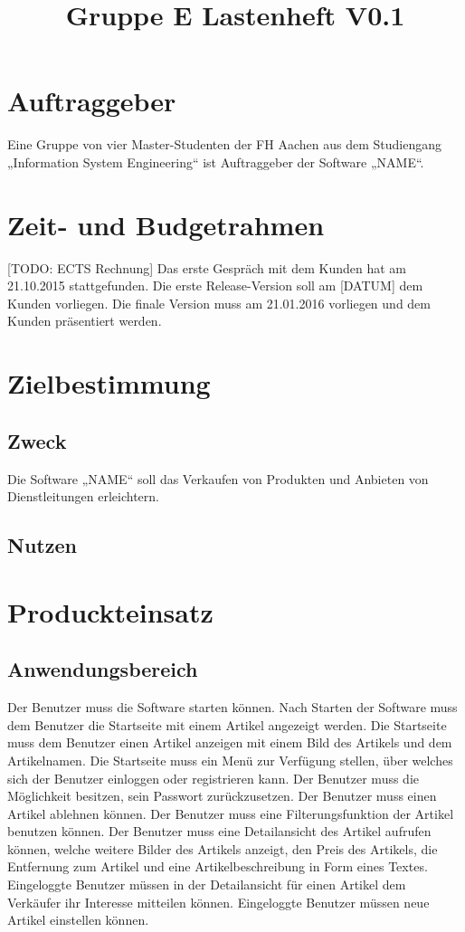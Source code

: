 \documentclass[a4paper,12pt,oneside]{scrartcl}
\title{Gruppe E Lastenheft V0.1}
\begin{document}
\maketitle
\newpage
\tableofcontents
\newpage

\section{Auftraggeber}
Eine Gruppe von vier Master-Studenten der FH Aachen aus dem Studiengang „Information System Engineering“ ist Auftraggeber der Software „NAME“. 




\section{Zeit- und Budgetrahmen}
[TODO: ECTS Rechnung]
Das erste Gespräch mit dem Kunden hat am 21.10.2015 stattgefunden. Die erste Release-Version soll am [DATUM] dem Kunden vorliegen. Die finale Version muss am 21.01.2016 vorliegen und dem Kunden präsentiert werden.




\section{Zielbestimmung}
\subsection{Zweck}
Die Software „NAME“ soll das Verkaufen von Produkten und Anbieten von Dienstleitungen erleichtern.

\subsection{Nutzen}




\section{Produckteinsatz}
\subsection{Anwendungsbereich}
Der Benutzer muss die Software starten können. Nach Starten der Software muss dem Benutzer die Startseite mit einem Artikel angezeigt werden. Die Startseite muss dem Benutzer einen Artikel anzeigen mit einem Bild des Artikels und dem Artikelnamen. Die Startseite muss ein Menü zur Verfügung stellen, über welches sich der Benutzer einloggen oder registrieren kann. Der Benutzer muss die Möglichkeit besitzen, sein Passwort zurückzusetzen. 
Der Benutzer muss einen Artikel ablehnen können. Der Benutzer muss eine Filterungsfunktion der Artikel benutzen können. Der Benutzer muss eine Detailansicht des Artikel aufrufen können, welche weitere Bilder des Artikels anzeigt, den Preis des Artikels, die Entfernung zum Artikel und eine Artikelbeschreibung in Form eines Textes. Eingeloggte Benutzer müssen in der Detailansicht für einen Artikel dem Verkäufer ihr Interesse mitteilen können. Eingeloggte Benutzer müssen neue Artikel einstellen können. 
\end{document}
